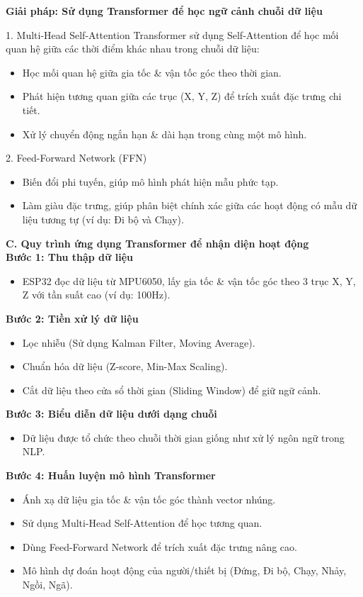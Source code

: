 \documentclass[journal]{IEEEtran}
\begin{document}
\textbf{Giải pháp: Sử dụng Transformer để học ngữ cảnh chuỗi dữ liệu}

1. Multi-Head Self-Attention
Transformer sử dụng Self-Attention để học mối quan hệ giữa các thời điểm khác nhau trong chuỗi dữ liệu:
\begin{itemize}
    \item Học mối quan hệ giữa gia tốc \& vận tốc góc theo thời gian.
    \item Phát hiện tương quan giữa các trục (X, Y, Z) để trích xuất đặc trưng chi tiết.
    \item Xử lý chuyển động ngắn hạn \& dài hạn trong cùng một mô hình.
\end{itemize}

2. Feed-Forward Network (FFN)
\begin{itemize}
    \item Biến đổi phi tuyến, giúp mô hình phát hiện mẫu phức tạp.
    \item Làm giàu đặc trưng, giúp phân biệt chính xác giữa các hoạt động có mẫu dữ liệu tương tự (ví dụ: Đi bộ và Chạy).
\end{itemize}

\textbf{C. Quy trình ứng dụng Transformer để nhận diện hoạt động}\\
\textbf{Bước 1: Thu thập dữ liệu}
\begin{itemize}
    \item ESP32 đọc dữ liệu từ MPU6050, lấy gia tốc \& vận tốc góc theo 3 trục X, Y, Z với tần suất cao (ví dụ: 100Hz).
\end{itemize}

\textbf{Bước 2: Tiền xử lý dữ liệu}
\begin{itemize}
    \item Lọc nhiễu (Sử dụng Kalman Filter, Moving Average).
    \item Chuẩn hóa dữ liệu (Z-score, Min-Max Scaling).
    \item Cắt dữ liệu theo cửa sổ thời gian (Sliding Window) để giữ ngữ cảnh.
\end{itemize}

\textbf{Bước 3: Biểu diễn dữ liệu dưới dạng chuỗi}
\begin{itemize}
    \item Dữ liệu được tổ chức theo chuỗi thời gian giống như xử lý ngôn ngữ trong NLP.
\end{itemize}

\textbf{Bước 4: Huấn luyện mô hình Transformer}
\begin{itemize}
    \item Ánh xạ dữ liệu gia tốc \& vận tốc góc thành vector nhúng.
    \item Sử dụng Multi-Head Self-Attention để học tương quan.
    \item Dùng Feed-Forward Network để trích xuất đặc trưng nâng cao.
    \item Mô hình dự đoán hoạt động của người/thiết bị (Đứng, Đi bộ, Chạy, Nhảy, Ngồi, Ngã).
\end{itemize}
\end{document}
